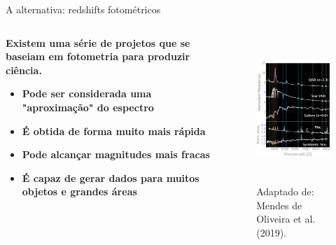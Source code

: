 \begin{frame}[c]{A alternativa: redshifts fotométricos}
    \begin{columns}[c]
        \begin{column}{0.46\linewidth}
            \justifying
            \textbf{Existem uma série de projetos que se baseiam em fotometria para produzir ciência.}
            \begin{itemize}
                \justifying
                \item \textbf{Pode ser considerada uma "aproximação" do espectro}
                \item \textbf{É obtida de forma muito mais rápida}
                \item \textbf{Pode alcançar magnitudes mais fracas}
                \item \textbf{É capaz de gerar dados para muitos objetos e grandes áreas}
            \end{itemize}
        \end{column}
        \hspace*{-0.5cm}
        \begin{column}{0.46\linewidth}
            \begin{figure}
                \centering
                \includegraphics[height=5.5cm]{script/images/splus_spectra_sed.png}
                \caption{Adaptado de: Mendes de Oliveira et al. (2019).}
            \end{figure}
        \end{column}
    \end{columns}
\end{frame}

